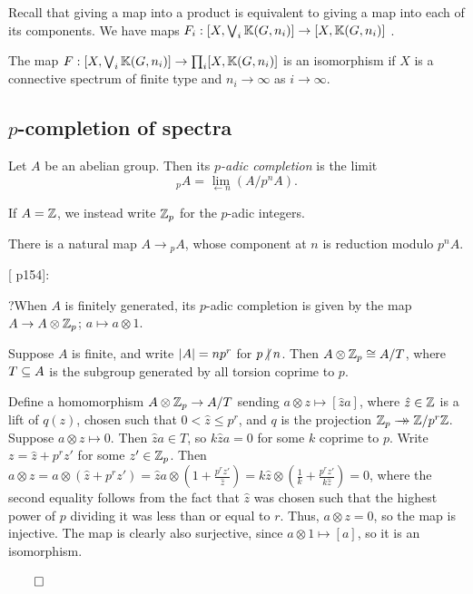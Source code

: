 \documentclass{MetricNotes2023}
\newcommand{\surj}{\rightarrow\mathrel{\mkern-14mu}\rightarrow}
\def\bb{\ensuremath\mathbb}
\def\subq{\ensuremath\subseteq}
\def\inte{\ensuremath\mathbb{Z}}
\def\done{\begin{flushright}\vspace{-4.35ex}\(\qed\)\end{flushright}}
\def\nvert{\ensuremath\hspace{-0.5ex}\not\vert\hspace{0.5ex}}
\begin{document}
Recall that giving a map into a product is equivalent to giving a map into each of its components. We have maps \(F_i : [X, \bigvee_i \bb{K}(G,n_i)]\to [X,\bb{K}(G,n_i)]\) .

\begin{proposition}\label{2503231218}
The map \(F : [X, \bigvee_i \bb{K}(G,n_i)]\to \prod_i [X,\bb{K}(G,n_i)]\) is an isomorphism if \(X\) is a connective spectrum of finite type and \(n_i\to \infty\) as \(i\to\infty\). 
\end{proposition}

\subsection{\(p\)-completion of spectra}

\begin{definition}
Let \(A\) be an abelian group. Then its \textit{\(p\)-adic completion} is the limit 
\[\text{}_pA=\lim\limits_{\leftarrow n} (A/p^nA).\]
\end{definition}

If \(A=\inte\), we instead write \(\inte_p\) for the \(p\)-adic integers.

There is a natural map \(A \to \text{}_pA\), whose component at \(n\) is reduction modulo \(p^nA\). 

[\autocite{concise} p154]:

?When \(A\) is finitely generated, its \(p\)-adic completion is given by the map \(A \to A\otimes \inte_p\); \(a\mapsto a\otimes 1\). 

\begin{lemma}\label{2504031247}
Suppose \(A\) is finite, and write \(\lvert A\rvert=np^r\) for \(p\nvert n\). Then \(A\otimes\inte_p\cong A/T\), where \(T\subq A\) is the subgroup generated by all torsion coprime to \(p\).
\end{lemma}

\begin{ourproof}
Define a homomorphism \(A\otimes\inte_p\to A/T\) sending \(a\otimes z \mapsto [\hat za]\), where \(\hat z\in \inte\) is a lift of \(q(z)\), chosen such that \(0 < \hat z \leq p^{r}\), and \(q\) is the projection \(\inte_p \surj \inte/p^r\inte\). Suppose \(a\otimes z\mapsto 0\).  Then \(\hat za\in T\), so \(k\hat za=0\) for some \(k\) coprime to \(p\). Write \(z=\hat z + p^rz'\) for some \(z'\in\inte_p\). Then \(a\otimes z = a\otimes(\hat z + p^r z')=\hat za\otimes(1 + \frac{p^rz'}{\hat z})=k\hat z\otimes(\frac{1}{k}+\frac{p^rz'}{k\hat z})=0\), where the second  equality follows from the fact that \(\hat z\) was chosen such that the highest power of \(p\) dividing it was less than or equal to \(r\).%
\text{ }Thus, \(a\otimes z = 0\), so the map is injective. The map is clearly also surjective, since \(a\otimes 1 \mapsto [a]\), so it is an isomorphism. \done
\end{ourproof}
\end{document}
